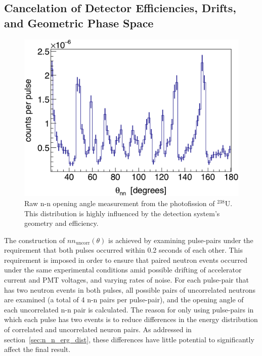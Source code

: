 \subsection{Cancelation of Detector Efficiencies, Drifts, and Geometric Phase Space}
\label{subsec:SPDPCancelation}
\begin{figure}[h]
\includegraphics[width=\figsize\textwidth]{./DetAcceptance.png}
\caption{Raw n-n opening angle measurement from the photofission of $^{238}$U. 
This distribution is highly influenced by the detection system's geometry and efficiency.
}
\label{fig:DetAcceptance}
\end{figure}

The construction of $nn_{\text{uncorr}}(\theta)$ is achieved by examining pulse-pairs under the requirement that both pulses occurred within 0.2 seconds of each other.
This requirement is imposed in order to ensure that paired neutron events occurred under the same experimental conditions amid possible drifting of accelerator current and PMT voltages, and varying rates of noise.
For each pulse-pair that has two neutron events in both pulses, all possible pairs of uncorrelated neutrons are examined (a total of 4 n-n pairs per pulse-pair), and the opening angle of each uncorrelated n-n pair is calculated.
The reason for only using pulse-pairs in which each pulse has two events is to reduce differences in the energy distribution of correlated and uncorrelated neuron pairs.
As addressed in section~\ref{sec:n_n_erg_dist}, these differences have little potential to significantly affect the final result.

